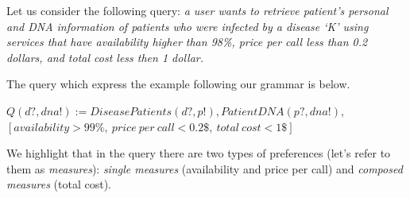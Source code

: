 Let us consider the following query: \textit{a user wants to retrieve patient's personal and DNA information of patients who were infected by a disease `K' using services that have availability higher than 98\%, price per call less than 0.2 dollars, and total cost less then 1 dollar.} 


The query which express the example following our grammar is below.
\begin{small}
\begin{center}
$Q (d?, dna!) := DiseasePatients(d?, p!), PatientDNA(p?, dna!),$ \\
$[availability > 99\%, \ price \ per \ call < 0.2\$, \ total \ cost < 1\$]$
\end{center} 
\end{small}

We highlight that in the query there are two types of preferences (let's refer
to them as \textit{measures}): \textit{single measures} (availability and price
per call) and \textit{composed measures} (total cost).

  
